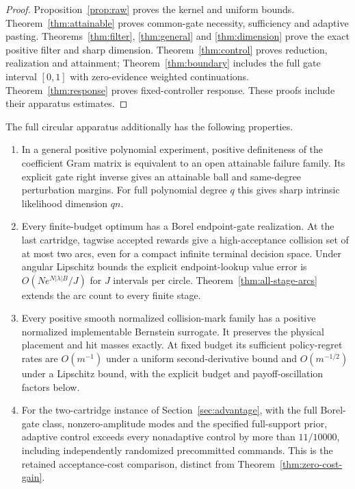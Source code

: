 \begin{proof}
Proposition~\ref{prop:raw} proves the kernel and uniform bounds.
Theorem~\ref{thm:attainable} proves common-gate necessity, sufficiency and
adaptive pasting. Theorems~\ref{thm:filter}, \ref{thm:general} and
\ref{thm:dimension} prove the exact positive filter and sharp dimension.
Theorem~\ref{thm:control} proves reduction, realization and attainment;
Theorem~\ref{thm:boundary} includes the full gate interval $[0,1]$ with
zero-evidence weighted continuations. Theorem~\ref{thm:response} proves
fixed-controller response. These proofs include their apparatus estimates.
\end{proof}

\begin{theorem}\label{thm:strengthening}
The full circular apparatus additionally has the following properties.
\begin{enumerate}
\item In a general positive polynomial experiment, positive definiteness
of the coefficient Gram matrix is equivalent to an open attainable failure
family. Its explicit gate right inverse gives an attainable ball and
same-degree perturbation margins. For full polynomial degree $q$ this
gives sharp intrinsic likelihood dimension $qn$.
\item Every finite-budget optimum has a Borel endpoint-gate realization.
At the last cartridge, tagwise accepted rewards give a high-acceptance
collision set of at most two arcs, even for a compact infinite terminal
decision space. Under angular Lipschitz bounds the explicit endpoint-lookup
value error is $O(Ne^{N|\lambda|B}/J)$ for $J$ intervals per circle.
Theorem~\ref{thm:all-stage-arcs} extends the arc count to every finite stage.
\item Every positive smooth normalized collision-mark family has a
positive normalized implementable Bernstein surrogate. It preserves the
physical placement and hit masses exactly. At fixed budget its sufficient
policy-regret rates are $O(m^{-1})$ under a uniform second-derivative bound
and $O(m^{-1/2})$ under a Lipschitz bound, with the explicit budget and
payoff-oscillation factors below.
\item For the two-cartridge instance of Section~\ref{sec:advantage}, with
the full Borel-gate class, nonzero-amplitude modes and the specified
full-support prior, adaptive control exceeds every nonadaptive control by
more than $11/10000$, including independently randomized precommitted
commands. This is the retained acceptance-cost comparison, distinct from
Theorem~\ref{thm:zero-cost-gain}.
\end{enumerate}
\end{theorem}
